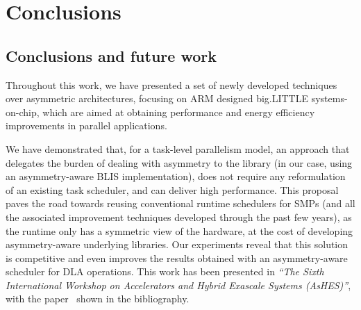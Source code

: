 \cleardoublepage

\chapter*{Conclusions}

\section*{Conclusions and future work}


Throughout this work, we have presented a set of newly developed techniques
over asymmetric architectures, focusing on ARM designed big.LITTLE
systems-on-chip, which are aimed at obtaining performance and energy
efficiency improvements in parallel applications.



We have demonstrated that, for a task-level parallelism model, an approach
that delegates the burden of dealing with asymmetry to the library (in our
case, using an asymmetry-aware BLIS implementation), does not require any
reformulation of an existing task scheduler, and can deliver high
performance. This proposal paves the road towards reusing conventional
runtime schedulers for SMPs (and all the associated improvement techniques
developed through the past few years), as the runtime only has a symmetric
view of the hardware, at the cost of developing asymmetry-aware underlying
libraries. Our experiments reveal that this solution is competitive and
even improves the results obtained with an asymmetry-aware scheduler for
DLA operations. This work has been presented in \emph{``The Sixth
  International Workshop on Accelerators and Hybrid Exascale Systems
  (AsHES)''}, with the paper~\cite{ashes} shown in the bibliography.





